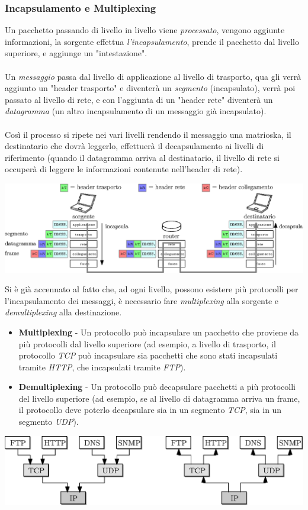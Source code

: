 \documentclass[12pt, letterpaper]{article}
\newcommand{\acc}{\\\hphantom{}\\}
\begin{document}
\subsubsection{Incapsulamento e Multiplexing}
Un pacchetto passando di livello in livello viene \textit{processato}, vengono aggiunte informazioni,
la sorgente effettua \textit{l'incapsulamento}, prende il pacchetto dal livello superiore,
e aggiunge un "intestazione".\acc
Un \textit{messaggio} passa dal livello di applicazione al livello di trasporto, qua gli verrà aggiunto un
"header trasporto" e diventerà un \textit{segmento} (incapsulato), verrà poi passato al livello di rete,
e con l'aggiunta di un "header rete" diventerà un \textit{datagramma} (un altro incapsulamento di un
messaggio già incapsulato). \acc
Così il processo si ripete nei vari livelli rendendo il messaggio una matrioska, il destinatario
che dovrà leggerlo, effettuerà il decapsulamento ai livelli di riferimento (quando il datagramma arriva al
destinatario, il livello di rete si occuperà di leggere le informazioni contenute nell'header di rete).
\begin{center}
    \includegraphics[width=1\textwidth ]{images/incapsulamento.eps}
\end{center}
Si è già accennato al fatto che, ad ogni livello, possono esistere più protocolli per l'incapsulamento
dei messaggi, è necessario fare \textit{multiplexing} alla sorgente e \textit{demultiplexing}
alla destinazione. \begin{itemize}
    \item \textbf{Multiplexing} - Un protocollo può incapsulare un pacchetto che proviene da più protocolli
          dal livello superiore (ad esempio, a livello di trasporto, il protocollo \textit{TCP} può incapsulare
          sia pacchetti che sono stati incapsulati tramite \textit{HTTP}, che incapsulati tramite \textit{FTP}).
    \item \textbf{Demultiplexing} - Un protocollo può decapsulare pacchetti a più protocolli del livello
          superiore (ad esempio, se al livello di datagramma arriva un frame, il protocollo deve poterlo decapsulare sia
          in un segmento \textit{TCP}, sia in un segmento \textit{UDP}).
\end{itemize} \begin{center}
    \includegraphics[width=1\textwidth ]{images/multiplexing.eps}
\end{center}
\end{document}
